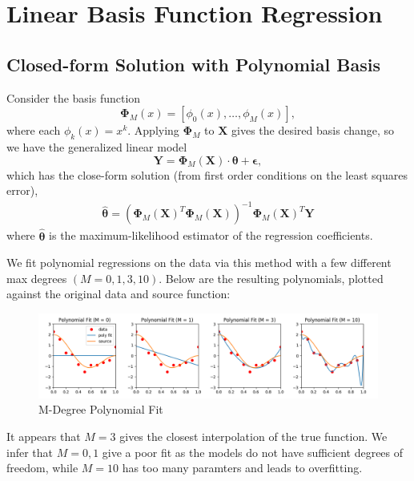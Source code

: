 \documentclass[8pt]{article}
\begin{document}

\section{Linear Basis Function Regression}

\subsection{Closed-form Solution with Polynomial Basis}
Consider the basis function $$\bm \Phi_M(x) = [\phi_0(x), \dots, \phi_M(x)],$$ where each $\phi_k(x) = x^k$. Applying $\bm \Phi_M$ to $\mathbf{X}$ gives the desired basis change, so we have the generalized linear model
\[
\mathbf Y = \bm \Phi_M(\mathbf X) \cdot \bm \theta + \bm \epsilon,
\]
which has the close-form solution (from first order conditions on the least squares error\footnotemark),
%
\begin{align*}
\hat{\bm \theta} = (\bm \Phi_M(\mathbf X)^T \bm \Phi_M(\mathbf X))^{-1} \bm \Phi_M(\mathbf X)^T \mathbf Y
\end{align*}
%
where $\hat{\bm \theta}$ is the maximum-likelihood estimator of the regression coefficients.


We fit polynomial regressions on the data via this method with a few different max degrees $(M = 0, 1, 3, 10)$. Below are the resulting polynomials, plotted against the original data and source function:%


\begin{figure}[H]
  \centering
  \includegraphics[width = 6.5in]{../P2/figs/part_1.png}
  \caption{M-Degree Polynomial Fit}
\end{figure}

It appears that $M = 3$ gives the closest interpolation of the true function. We infer that $M = 0, 1$ give a poor fit as the models do not have sufficient degrees of freedom, while $M = 10$ has too many paramters and leads to overfitting.
\end{document}
